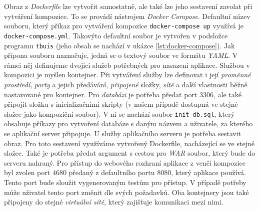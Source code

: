 \documentclass[czech, ma, kiv, he, iso690alph, pdf, viewonly]{fasthesis}
\begin{document}
    Obraz z \textit{Dockerfile} lze vytvořit samostatně, ale také lze jeho sestavení zavolat při vytváření kompozice. To se provádí nástrojem \textit{Docker Compose}. Defaultní název souboru, který příkaz pro vytváření kompozice \verb|docker-compose up| využívá je \verb|docker-compose.yml|. Takovýto defaultní soubor je vytvořen v podsložce programu \verb|tbuis| (jeho obsah se nachází v ukázce \ref{lst:docker-compose}). Jak přípona souboru naznačuje, jedná se o textový soubor ve formátu \textit{YAML}. V rámci něj definujeme dvojici služeb potřebných pro nasazení aplikace. Službou v kompozici je myšlen kontejner. Při vytváření služby lze definovat i její \textit{proměnné prostředí}, \textit{porty} a jejich předávání, \textit{připojené} složky, \textit{sítě} a další vlastnosti běžně nastavované pro kontejner. Pro \textit{databázi} je potřeba předat port \(3306\), ale také připojit složku s inicializačními skripty (v našem případě dostupná ve stejné složce jako kompoziční soubor). V ní se nachází soubor \verb|init-db.sql|, který obsahuje příkazy pro vytvoření databáze s daným názvem a uživatele, za kterého se aplikační server připojuje. U služby aplikačního serveru je potřeba sestavit obraz. Pro toto sestavení využíváme vytvořený Dockerfile, nacházející se ve stejné složce. Také je potřeba předat argument s cestou pro \textit{WAR} soubor, který bude do serveru nahraný. Pro přístup do webového rozhraní aplikace z venčí kompozice byl zvolen port \(4680\) předaný z defaultního portu \(8080\), který aplikace používá. Tento port bude sloužit vygenerovaným testům pro přístup. V případě potřeby může uživatel tento port změnit dle svých požadavků. Oba kontejnery jsou také připojeny do stejné \textit{virtuální sítě}, který zajišťuje komunikaci mezi nimi. 

\end{document}

